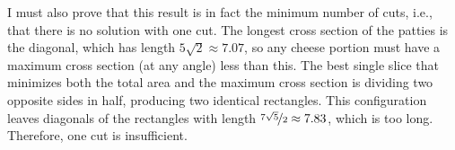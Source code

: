 \documentclass{article}
\begin{document}
I must also prove that this result is in fact the minimum number of cuts, i.e., that there is no solution with one cut.
The longest cross section of the patties is the diagonal, which has length $5\sqrt{2}\approx7.07$, so any cheese portion must have a maximum cross section (at any angle) less than this.
The best single slice that minimizes both the total area and the maximum cross section is dividing two opposite sides in half, producing two identical rectangles.
This configuration leaves diagonals of the rectangles with length $\nicefrac{7\sqrt{5}}{2}\approx7.83$, which is too long.
Therefore, one cut is insufficient.
\end{document}
